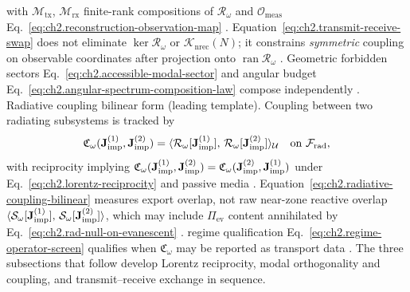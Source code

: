 with \(\mathcal{M}_{\mathrm{tx}}\), \(\mathcal{M}_{\mathrm{rx}}\) finite-rank compositions of
\(\mathcal{R}_\omega\) and \(\mathcal{O}_{\mathrm{meas}}\) Eq.~\eqref{eq:ch2.reconstruction-observation-map}
\cite{stratton1941}. Equation~\eqref{eq:ch2.transmit-receive-swap}
does not eliminate \(\ker\mathcal{R}_\omega\) or \(\mathcal{K}_{\mathrm{nrec}}(N)\); it
constrains \emph{symmetric} coupling on observable coordinates after projection onto
\(\operatorname{ran}\mathcal{R}_\omega\) \cite{stratton1941}. Geometric forbidden sectors
Eq.~\eqref{eq:ch2.accessible-modal-sector} and angular budget
Eq.~\eqref{eq:ch2.angular-spectrum-composition-law} compose independently
\cite{harrington2001}.
Radiative coupling bilinear form (leading template). Coupling between two radiating subsystems is tracked by
\begin{equation}
\mathfrak{C}_\omega(\mathbf{J}_{\mathrm{imp}}^{(1)},\mathbf{J}_{\mathrm{imp}}^{(2)})
=
\langle \mathcal{R}_\omega[\mathbf{J}_{\mathrm{imp}}^{(1)}],\,\mathcal{R}_\omega[\mathbf{J}_{\mathrm{imp}}^{(2)}]\rangle_{\mathcal{U}}
\quad\text{on}\ \mathcal{F}_{\mathrm{rad}},
\end{equation}
with reciprocity implying \(\mathfrak{C}_\omega(\mathbf{J}_{\mathrm{imp}}^{(1)},\mathbf{J}_{\mathrm{imp}}^{(2)})=\mathfrak{C}_\omega(\mathbf{J}_{\mathrm{imp}}^{(2)},\mathbf{J}_{\mathrm{imp}}^{(1)})\)
under Eq.~\eqref{eq:ch2.lorentz-reciprocity} and passive media
\cite{stratton1941}. Equation~\eqref{eq:ch2.radiative-coupling-bilinear}
measures export overlap, not raw near-zone reactive overlap
\(\langle \mathcal{S}_\omega[\mathbf{J}_{\mathrm{imp}}^{(1)}],\,\mathcal{S}_\omega[\mathbf{J}_{\mathrm{imp}}^{(2)}]\rangle\), which may include
\(\Pi_{\mathrm{ev}}\) content annihilated by Eq.~\eqref{eq:ch2.rad-null-on-evanescent}
\cite{stratton1941}. regime qualification Eq.~\eqref{eq:ch2.regime-operator-screen} qualifies when
\(\mathfrak{C}_\omega\) may be reported as transport data \cite{harrington2001}.
The three subsections that follow develop Lorentz reciprocity, modal orthogonality and coupling, and transmit--receive exchange in sequence.
